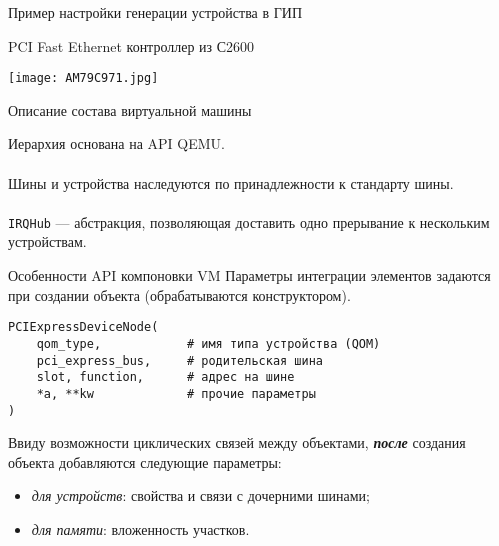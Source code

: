 \documentclass[unicode,hyperref={unicode=true}]{beamer}
\theoremstyle{definition}
\theoremstyle{plain}
\begin{document}
\begin{frame}{Пример настройки генерации устройства в ГИП}
\begin{center}
PCI Fast Ethernet контроллер из С2600
\end{center}
\texttt{[image: AM79C971.jpg]}
\end{frame}



\begin{frame}[fragile]{Описание состава виртуальной машины}

\begin{minipage}{0.61\textwidth}
\end{minipage}
\begin{minipage}{0.37\textwidth}
Иерархия основана на API QEMU.\\
 \\
Шины и устройства наследуются по принадлежности к стандарту шины.\\
 \\
\texttt{IRQHub} --- абстракция, позволяющая доставить одно прерывание к
нескольким устройствам.
\end{minipage}
\end{frame}



\begin{frame}[fragile]{Особенности API компоновки VM}
Параметры интеграции элементов задаются при создании объекта (обрабатываются
конструктором).\\
\lstset{language=Python}
\begin{lstlisting}
PCIExpressDeviceNode(
    qom_type,            # имя типа устройства (QOM)
    pci_express_bus,     # родительская шина
    slot, function,      # адрес на шине
    *a, **kw             # прочие параметры
)
\end{lstlisting}
\vfill
Ввиду возможности циклических связей между объектами, \textit{\textbf{после}}
создания объекта добавляются следующие параметры:
\begin{itemize}
\item \textit{для устройств}: свойства и связи с дочерними шинами;
\item \textit{для памяти}: вложенность участков.
\end{itemize}
\end{frame}
\end{document}
